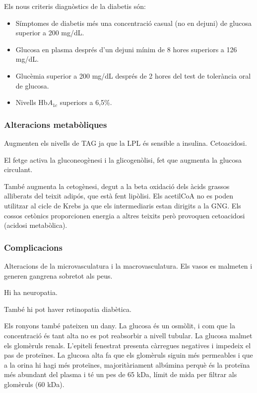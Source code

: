 Els nous criteris diagnòstics de la diabetis són:
\begin{itemize}
\item Símptomes de diabetis més una concentració casual (no en dejuni)
  de glucosa superior a 200 mg/dL.
\item Glucosa en plasma després d'un dejuni mínim de 8 hores superiors
  a 126 mg/dL.
\item Glucèmia superior a 200 mg/dL després de 2 hores del test de
  tolerància oral de glucosa.
\item Nivells Hb$A_{1c}$ superiors a 6,5\%.
\end{itemize}


\subsubsection{Alteracions metabòliques}
\label{sec:alter-metab}
Augmenten els nivells de TAG ja que la LPL és sensible a
insulina. Cetoacidosi.

El fetge activa la gluconeogènesi i la glicogenòlisi, fet que augmenta
la glucosa circulant.

També augmenta la cetogènesi, degut a la beta oxidació dels àcids
grassos alliberats del teixit adipós, que està fent lipòlisi. Els
acetilCoA no es poden utilitzar al cicle de Krebs ja que els
intermediaris estan dirigits a la GNG. Els cossos cetònics
proporcionen energia a altres teixits però provoquen cetoacidosi
(acidosi metabòlica).

\subsubsection{Complicacions}
\label{sec:complicacions}
Alteracions de la microvasculatura i la macrovasculatura. Els vasos es
malmeten i generen gangrena sobretot als peus.

Hi ha neuropatia.

També hi pot haver retinopatia diabètica.

Els ronyons també pateixen un dany. La glucosa és un osmòlit, i com
que la concentració és tant alta no es pot reabsorbir a nivell
tubular. La glucosa malmet els glomèruls renals. L'epiteli fenestrat
presenta càrregues negatives i impedeix el pas de proteïnes. La
glucosa alta fa que els glomèruls siguin més permeables i que a la
orina hi hagi més proteïnes, majoritàriament albúmina perquè és la
proteïna més abundant del plasma i té un pes de 65 kDa, límit de mida
per filtrar als glomèruls (60 kDa).

